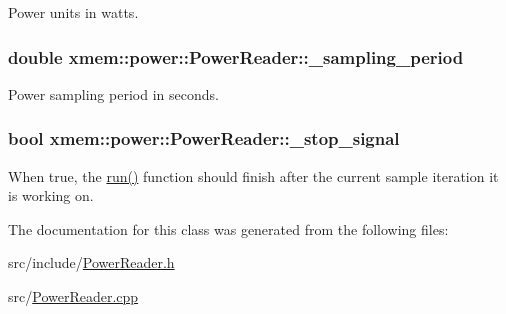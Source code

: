 Power units in watts. \hypertarget{classxmem_1_1power_1_1_power_reader_a1c7d9b505d3c94347c43437a568e5948}{
\subsubsection[{\-\_\-sampling\-\_\-period}]{\setlength{\rightskip}{0pt plus 5cm}double xmem\-::power\-::\-Power\-Reader\-::\-\_\-sampling\-\_\-period\hspace{0.3cm}{\ttfamily [protected]}}}\label{classxmem_1_1power_1_1_power_reader_a1c7d9b505d3c94347c43437a568e5948}
Power sampling period in seconds. \hypertarget{classxmem_1_1power_1_1_power_reader_a1c0c890279f3f2b7eb41ab3e5889bf2e}{
\subsubsection[{\-\_\-stop\-\_\-signal}]{\setlength{\rightskip}{0pt plus 5cm}bool xmem\-::power\-::\-Power\-Reader\-::\-\_\-stop\-\_\-signal\hspace{0.3cm}{\ttfamily [protected]}}}\label{classxmem_1_1power_1_1_power_reader_a1c0c890279f3f2b7eb41ab3e5889bf2e}
When true, the \hyperlink{classxmem_1_1power_1_1_power_reader_ad8286b3727efbcb0ff5049c6594d126a}{run()} function should finish after the current sample iteration it is working on. 

The documentation for this class was generated from the following files\-:\begin{DoxyCompactItemize}
\item 
src/include/\hyperlink{_power_reader_8h}{Power\-Reader.\-h}\item 
src/\hyperlink{_power_reader_8cpp}{Power\-Reader.\-cpp}\end{DoxyCompactItemize}

